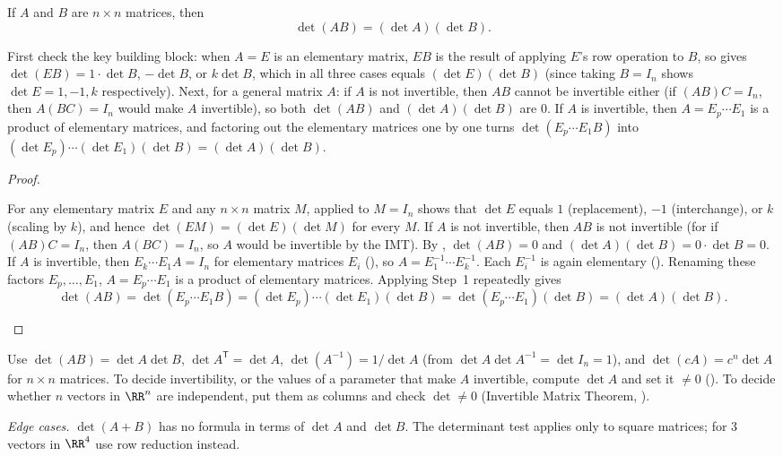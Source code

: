 \documentclass[10pt]{scrartcl}
\begin{document}
\begin{theorem*}
  If $A$ and $B$ are $n\times n$ matrices, then
  \[
    \det(AB) = (\det A)(\det B).
  \]
\end{theorem*}
\begin{ideabox}
  First check the key building block: when $A=E$ is an elementary matrix, $EB$ is the result of applying $E$'s row operation to $B$, so  gives $\det(EB)=1\cdot\det B$, $-\det B$, or $k\det B$, which in all three cases equals $(\det E)(\det B)$ (since taking $B=I_n$ shows $\det E=1,-1,k$ respectively). Next, for a general matrix $A$: if $A$ is not invertible, then $AB$ cannot be invertible either (if $(AB)C=I_n$, then $A(BC)=I_n$ would make $A$ invertible), so both $\det(AB)$ and $(\det A)(\det B)$ are $0$. If $A$ is invertible, then $A=E_p\cdots E_1$ is a product of elementary matrices, and factoring out the elementary matrices one by one turns $\det(E_p\cdots E_1 B)$ into $(\det E_p)\cdots(\det E_1)(\det B)=(\det A)(\det B)$.
\end{ideabox}
\begin{proof}
  \begin{steps}
    \ii For any elementary matrix $E$ and any $n\times n$ matrix $M$,  applied to $M=I_n$ shows that $\det E$ equals $1$ (replacement), $-1$ (interchange), or $k$ (scaling by $k$), and hence $\det(EM)=(\det E)(\det M)$ for every $M$.
    \ii If $A$ is not invertible, then $AB$ is not invertible (for if $(AB)C=I_n$, then $A(BC)=I_n$, so $A$ would be invertible by the IMT). By , $\det(AB)=0$ and $(\det A)(\det B)=0\cdot\det B=0$.
    \ii If $A$ is invertible, then $E_k\cdots E_1A=I_n$ for elementary matrices $E_i$ (), so $A=E_1^{-1}\cdots E_k^{-1}$. Each $E_i^{-1}$ is again elementary (). Renaming these factors $E_p,\dots,E_1$, $A=E_p\cdots E_1$ is a product of elementary matrices. Applying Step~1 repeatedly gives
    \[
      \det(AB) = \det(E_p\cdots E_1 B) = (\det E_p)\cdots(\det E_1)(\det B) = \det(E_p\cdots E_1)(\det B) = (\det A)(\det B).
    \]
  \end{steps}
\end{proof}

\begin{steps}
  \ii Use $\det(AB)=\det A\det B$, $\det A^{\mathsf T}=\det A$, $\det(A^{-1})=1/\det A$ (from $\det A\det A^{-1}=\det I_n=1$), and $\det(cA)=c^n\det A$ for $n\times n$ matrices.
  \ii To decide invertibility, or the values of a parameter that make $A$ invertible, compute $\det A$ and set it $\ne0$ ().
  \ii To decide whether $n$ vectors in $\RR^n$ are independent, put them as columns and check $\det\ne0$ (Invertible Matrix Theorem, ).
\end{steps}
\emph{Edge cases.} $\det(A+B)$ has no formula in terms of $\det A$ and $\det B$. The determinant test applies only to square matrices; for $3$ vectors in $\RR^4$ use row reduction instead.
\end{document}
